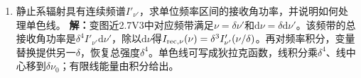 \documentclass[UTF8,fontset=fandol,a4paper,11pt]{ctexart}
\begin{document}
\begin{enumerate}
\item 静止系辐射具有连续频谱$I'_{\nu'}$，求单位频率区间的接收角功率，并说明如何处理单色线。
\textbf{解：}变图近2.7V3中对应频带满足$\nu=\delta\nu'$和$\mathrm d\nu=\delta\mathrm d\nu'$。该频带的总接收角功率是$\delta^4 I'_{\nu'}\mathrm d\nu'$，除以$\mathrm d\nu$得$I_{{\rm rec},\nu}(\nu)=\delta^3I'_{\nu'}(\nu/\delta)$。再对频率积分，变量替换提供另一$\delta$，恢复总强度$\delta^4$。单色线可写成狄拉克函数，线积分乘$\delta^4$、线中心移到$\delta\nu_0$；有限线能量由积分给出。
\begin{center}\begin{minipage}{.98\linewidth}\centering
{}
\end{minipage}
\end{center}
\end{enumerate}
\end{document}
